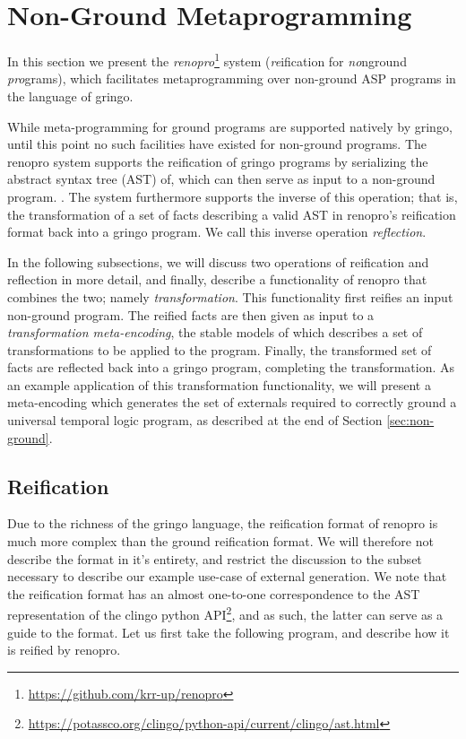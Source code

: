 \section{Non-Ground Metaprogramming}

In this section we present the
\emph{renopro}\footnote{\url{https://github.com/krr-up/renopro}}
system (\emph{re}ification for \emph{no}nground \emph{pro}grams), which
facilitates metaprogramming over non-ground ASP programs in the
language of gringo.

While meta-programming for ground programs are supported natively by
gringo, until this point no such facilities have existed for
non-ground programs. The renopro system supports the reification of
gringo programs by serializing the abstract syntax tree (AST) of,
which can then serve as input to a non-ground program. . The system
furthermore supports the inverse of this operation; that is, the
transformation of a set of facts describing a valid AST in renopro's
reification format back into a gringo program. We call this inverse
operation \emph{reflection}.

In the following subsections, we will discuss two operations of
reification and reflection in more detail, and finally, describe a
functionality of renopro that combines the two; namely
\emph{transformation}. This functionality first reifies an input
non-ground program. The reified facts are then given as input to a
\emph{transformation meta-encoding}, the stable models of which
describes a set of transformations to be applied to the
program. Finally, the transformed set of facts are reflected back into
a gringo program, completing the transformation. As an example
application of this transformation functionality, we will present a
meta-encoding which generates the set of externals required to
correctly ground a universal temporal logic program, as described at
the end of Section \ref{sec:non-ground}.

\subsection{Reification}

Due to the richness of the gringo language, the reification format of
renopro is much more complex than the ground reification format. We
will therefore not describe the format in it's entirety, and restrict
the discussion to the subset necessary to describe our example
use-case of external generation. We note that the reification format
has an almost one-to-one correspondence to the AST representation of
the clingo python
API\footnote{\url{https://potassco.org/clingo/python-api/current/clingo/ast.html}},
and as such, the latter can serve as a guide to the format. Let us
first take the following program, and describe how it is reified by
renopro.

